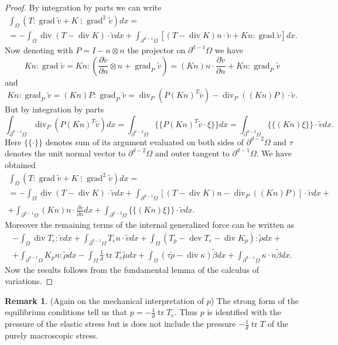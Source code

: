 \documentclass[a4paper,10pt,oneside]{amsbook}
\numberwithin{section}{chapter}
\numberwithin{equation}{chapter}
\theoremstyle{definition}
\newtheorem{rmk}[prop]{Remark}
\DeclareMathOperator{\dev}{dev}
\DeclareMathOperator{\diver}{div}
\DeclareMathOperator{\tr}{tr}
\DeclareMathOperator{\grad}{grad}
\newcommand{\dind}[2]{\frac{\partial #1}{\partial #2}}
\newcommand{\threedots}{\mathbin{\vdots}}
\begin{document}
\begin{proof}
By integration by parts we can write
\begin{multline*}
\int_\Omega\left(T:\grad\tilde v+K\threedots\grad^2\tilde v\right)dx=\\
=-\int_\Omega\diver(T-\diver K)\cdot\tilde vdx+\int_{\partial^{d-1}\Omega}\left[(T-\diver K)n\cdot\tilde v+Kn:\grad\tilde v\right]dx.
\end{multline*}
Now denoting with $P=I-n\otimes n$ the projector on $\partial^{d-1}\Omega$ we have
\[
Kn:\grad\tilde v=Kn:\left(\dind{\tilde v}{n}\otimes n+\grad_P\tilde v\right)=(Kn)n\cdot\dind{\tilde v}{n}+Kn:\grad_P\tilde v
\]
and
\[
Kn:\grad_P\tilde v=(Kn)P:\grad_P\tilde v=\diver_P(P(Kn)^T\tilde v)-\diver_P((Kn)P)\cdot\tilde v.
\]
But by integration by parts
\[
\int_{\partial^{d-1}\Omega}\diver_P(P(Kn)^T\tilde v)dx=\int_{\partial^{d-2}\Omega}\{\!\!\{P(Kn)^T\tilde v\cdot\xi\}\!\!\}dx=\int_{\partial^{d-2}\Omega}\{\!\!\{(Kn)\xi\}\!\!\}\cdot\tilde vdx.
\]
Here $\{\!\!\{\cdot\}\!\!\}$ denotes sum of its argument evaluated on both sides of $\partial^{d-2}\Omega$ and $\tau$ denotes the unit normal vector to $\partial^{d-2}\Omega$ and outer tangent to $\partial^{d-1}\Omega$. We have obtained
\begin{multline*}
\int_\Omega\left(T:\grad\tilde v+K\threedots\grad^2\tilde v\right)dx=\\
=-\int_\Omega\diver(T-\diver K)\cdot\tilde vdx+\int_{\partial^{d-1}\Omega}\left[(T-\diver K)n-\diver_P((Kn)P)\right]\cdot\tilde vdx+\\
+\int_{\partial^{d-1}\Omega}(Kn)n\cdot\dind{\tilde v}{n}dx+\int_{\partial^{d-2}\Omega}\{\!\!\{(Kn)\xi\}\!\!\}\cdot\tilde vdx.
\end{multline*}
Moreover the remaining terms of the internal generalized force can be written as
\begin{multline*}
-\int_\Omega\diver T_e:\tilde vdx+\int_{\partial^{d-1}\Omega}T_en\cdot\tilde vdx+\int_\Omega(T_p-\dev T_e-\diver K_p):\tilde\rho dx+\\
+\int_{\partial^{d-1}\Omega}K_pn:\tilde\rho dx-\int_\Omega\frac{1}{d}\tr T_e\tilde\mu dx+\int_\Omega(\tau\tilde\rho-\diver\kappa)\tilde\beta dx+\int_{\partial^{d-1}\Omega}\kappa\cdot n\tilde\beta dx.
\end{multline*}
Now the results follows from the fundamental lemma of the calculus of variations.
\end{proof}
\begin{rmk}(Again on the mechanical interpretation of $p$)
The strong form of the equilibrium conditions tell us that $p=-\frac{1}{d}\tr T_e$. Thus $p$ is identified with the pressure of the elastic stress but is does not include the pressure $-\frac{1}{d}\tr T$ of the purely macroscopic stress.
\end{rmk}
\end{document}
